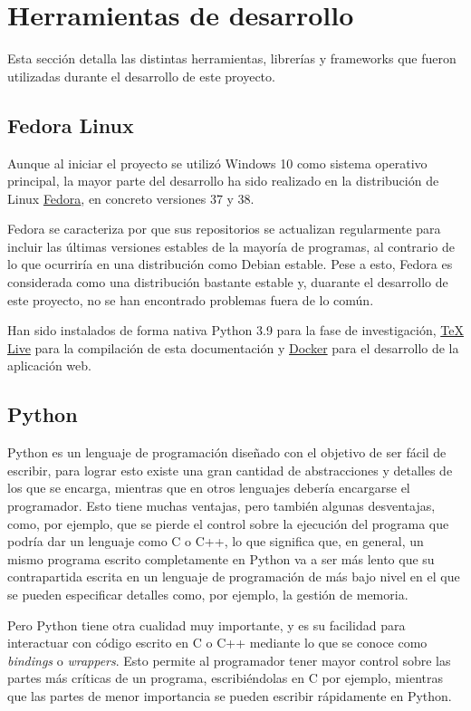 \section{Herramientas de desarrollo}

Esta sección detalla las distintas herramientas, librerías y frameworks que
fueron utilizadas durante el desarrollo de este proyecto.

\subsection{Fedora Linux}

Aunque al iniciar el proyecto se utilizó Windows 10 como sistema operativo
principal, la mayor parte del desarrollo ha sido realizado en la distribución de
Linux \href{https://fedoraproject.org/}{Fedora}, en concreto versiones 37 y 38.

Fedora se caracteriza por que sus repositorios se actualizan regularmente para
incluir las últimas versiones estables de la mayoría de programas, al contrario
de lo que ocurriría en una distribución como Debian estable. Pese a esto, Fedora
es considerada como una distribución bastante estable y, duarante el desarrollo
de este proyecto, no se han encontrado problemas fuera de lo común.

Han sido instalados de forma nativa Python 3.9 para la fase de investigación,
\href{https://www.tug.org/texlive/}{\TeX{} Live} para la compilación de esta
documentación y \href{https://www.docker.com/}{Docker} para el desarrollo de la
aplicación web.

\subsection{Python}

Python es un lenguaje de programación diseñado con el objetivo de ser fácil de
escribir, para lograr esto existe una gran cantidad de abstracciones y detalles
de los que se encarga, mientras que en otros lenguajes debería encargarse el
programador. Esto tiene muchas ventajas, pero también algunas desventajas, como,
por ejemplo, que se pierde el control sobre la ejecución del programa que podría
dar un lenguaje como C o C++, lo que significa que, en general, un mismo
programa escrito completamente en Python va a ser más lento que su contrapartida
escrita en un lenguaje de programación de más bajo nivel en el que se pueden
especificar detalles como, por ejemplo, la gestión de memoria.

Pero Python tiene otra cualidad muy importante, y es su facilidad para
interactuar con código escrito en C o C++ mediante lo que se conoce como
\textit{bindings} o \textit{wrappers}. Esto permite al programador tener mayor
control sobre las partes más críticas de un programa, escribiéndolas en C por
ejemplo, mientras que las partes de menor importancia se pueden escribir
rápidamente en Python.


